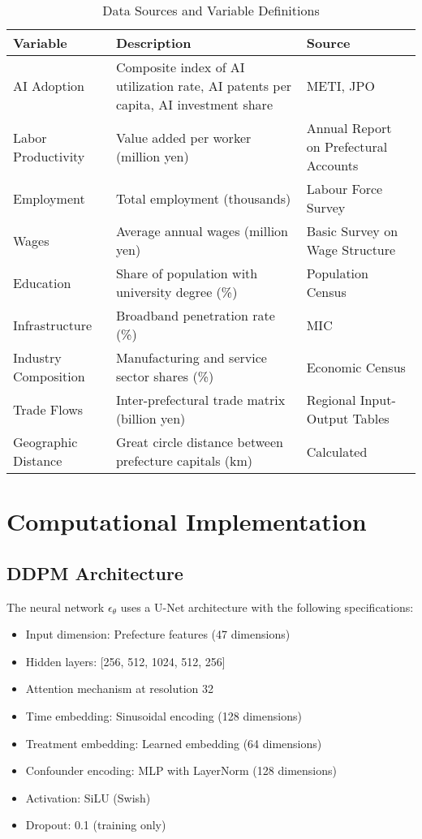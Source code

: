 \begin{table}[H]
\centering
\caption{Data Sources and Variable Definitions}
\label{tab:data_sources}
\begin{tabular}{p{3cm}p{6cm}p{4cm}}
\toprule
Variable & Description & Source \\
\midrule
AI Adoption & Composite index of AI utilization rate, AI patents per capita, AI investment share & METI, JPO \\
Labor Productivity & Value added per worker (million yen) & Annual Report on Prefectural Accounts \\
Employment & Total employment (thousands) & Labour Force Survey \\
Wages & Average annual wages (million yen) & Basic Survey on Wage Structure \\
Education & Share of population with university degree (\%) & Population Census \\
Infrastructure & Broadband penetration rate (\%) & MIC \\
Industry Composition & Manufacturing and service sector shares (\%) & Economic Census \\
Trade Flows & Inter-prefectural trade matrix (billion yen) & Regional Input-Output Tables \\
Geographic Distance & Great circle distance between prefecture capitals (km) & Calculated \\
\bottomrule
\end{tabular}
\end{table}

\section{Computational Implementation}

\subsection{DDPM Architecture}

The neural network $\epsilon_\theta$ uses a U-Net architecture with the following specifications:
\begin{itemize}
   \item Input dimension: Prefecture features (47 dimensions)
   \item Hidden layers: [256, 512, 1024, 512, 256]
   \item Attention mechanism at resolution 32
   \item Time embedding: Sinusoidal encoding (128 dimensions)
   \item Treatment embedding: Learned embedding (64 dimensions)
   \item Confounder encoding: MLP with LayerNorm (128 dimensions)
   \item Activation: SiLU (Swish)
   \item Dropout: 0.1 (training only)
\end{itemize}

